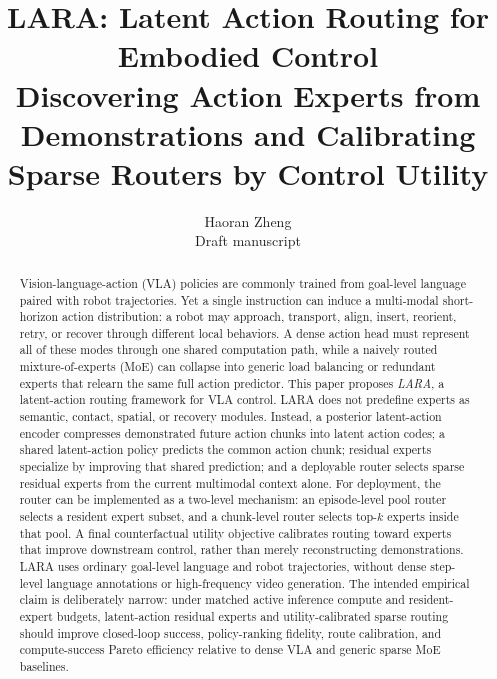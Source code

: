\documentclass[10pt]{article}
\title{\vspace{-1.0em}\textbf{LARA: Latent Action Routing for Embodied Control}\\[-0.2em]
\large Discovering Action Experts from Demonstrations and Calibrating Sparse Routers by Control Utility}
\author{Haoran Zheng\\
\small Draft manuscript}
\date{}
\begin{document}
\maketitle
\vspace{-1.5em}

\begin{abstract}
Vision-language-action (VLA) policies are commonly trained from goal-level language paired with robot trajectories. Yet a single instruction can induce a multi-modal short-horizon action distribution: a robot may approach, transport, align, insert, reorient, retry, or recover through different local behaviors. A dense action head must represent all of these modes through one shared computation path, while a naively routed mixture-of-experts (MoE) can collapse into generic load balancing or redundant experts that relearn the same full action predictor. This paper proposes \emph{LARA}, a latent-action routing framework for VLA control. LARA does not predefine experts as semantic, contact, spatial, or recovery modules. Instead, a posterior latent-action encoder compresses demonstrated future action chunks into latent action codes; a shared latent-action policy predicts the common action chunk; residual experts specialize by improving that shared prediction; and a deployable router selects sparse residual experts from the current multimodal context alone. For deployment, the router can be implemented as a two-level mechanism: an episode-level pool router selects a resident expert subset, and a chunk-level router selects top-$k$ experts inside that pool. A final counterfactual utility objective calibrates routing toward experts that improve downstream control, rather than merely reconstructing demonstrations. LARA uses ordinary goal-level language and robot trajectories, without dense step-level language annotations or high-frequency video generation. The intended empirical claim is deliberately narrow: under matched active inference compute and resident-expert budgets, latent-action residual experts and utility-calibrated sparse routing should improve closed-loop success, policy-ranking fidelity, route calibration, and compute-success Pareto efficiency relative to dense VLA and generic sparse MoE baselines.
\end{abstract}
\end{document}
